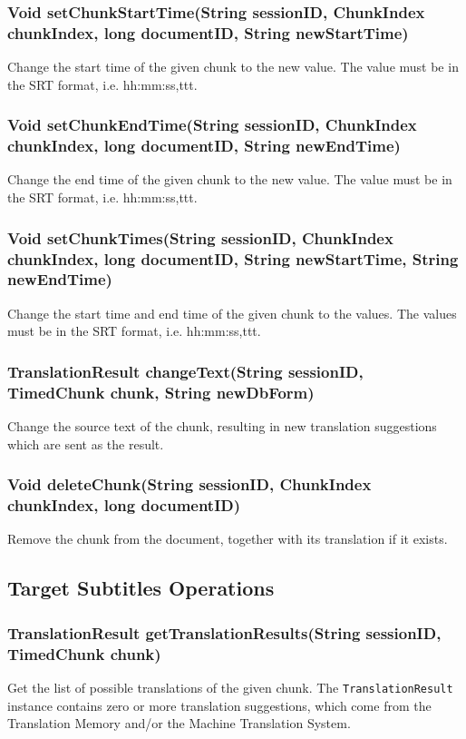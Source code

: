 {\subsubsection{Void setChunkStartTime(String sessionID, ChunkIndex chunkIndex, long documentID, String newStartTime)}
Change the start time of the given chunk to the new value. The value must be in the SRT format, i.e. hh:mm:ss,ttt.

\subsubsection{Void setChunkEndTime(String sessionID, ChunkIndex chunkIndex, long documentID, String newEndTime)}
Change the end time of the given chunk to the new value. The value must be in the SRT format, i.e. hh:mm:ss,ttt.

\subsubsection{Void setChunkTimes(String sessionID, ChunkIndex chunkIndex, long documentID, String newStartTime, String newEndTime)}
Change the start time and end time of the given chunk to the values. The values must be in the SRT format, i.e. hh:mm:ss,ttt.

\subsubsection{TranslationResult changeText(String sessionID, TimedChunk chunk, String newDbForm)}
Change the source text of the chunk,
resulting in new translation suggestions
which are sent as the result.

\subsubsection{Void deleteChunk(String sessionID, ChunkIndex chunkIndex, long documentID)}
Remove the chunk from the document, together with its translation if it exists.

\subsection{Target Subtitles Operations}

\subsubsection{TranslationResult getTranslationResults(String sessionID, TimedChunk chunk)}
Get the list of possible translations of the given chunk.
The {\tt TranslationResult} instance contains zero or more translation suggestions, which come from the Translation Memory and/or the Machine Translation System.

}
